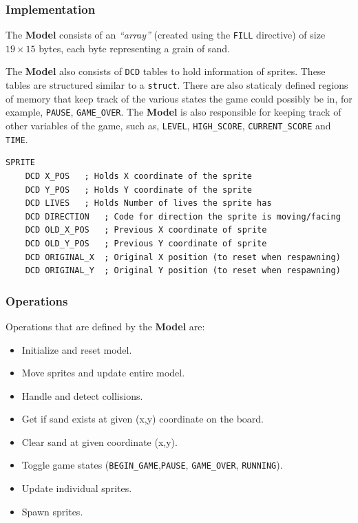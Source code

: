     \subsubsection{Implementation}

    The \textbf{Model} consists of an \emph{``array''} (created using the \texttt{FILL} directive)
    of size $19 \times 15$ bytes, each byte representing a grain of sand.

    The \textbf{Model} also consists of \texttt{DCD} tables to hold information of sprites. These tables are structured similar to a \texttt{struct}.
    There are also staticaly defined regions of memory that keep track of the various states the game could possibly be in,
    for example, \texttt{PAUSE}, \texttt{GAME\_OVER}.
    The \textbf{Model} is also responsible for keeping track of other variables of the game,
    such as, \texttt{LEVEL}, \texttt{HIGH\_SCORE}, \texttt{CURRENT\_SCORE} and \texttt{TIME}.


    \begin{lstlisting}[float,floatplacement=H,caption={Structure for \texttt{SPRITE} data}]
SPRITE
	DCD X_POS	; Holds X coordinate of the sprite
	DCD Y_POS	; Holds Y coordinate of the sprite
	DCD LIVES	; Holds Number of lives the sprite has
	DCD DIRECTION	; Code for direction the sprite is moving/facing
	DCD OLD_X_POS	; Previous X coordinate of sprite
	DCD OLD_Y_POS	; Previous Y coordinate of sprite
	DCD ORIGINAL_X	; Original X position (to reset when respawning)
	DCD ORIGINAL_Y	; Original Y position (to reset when respawning)

    \end{lstlisting}

    \subsubsection{Operations}

    Operations that are defined by the \textbf{Model} are:

    \begin{itemize}
      \item Initialize and reset model.
      \item Move sprites and update entire model.
      \item Handle and detect collisions.
      \item Get if sand exists at given (x,y) coordinate on the board.
      \item Clear sand at given coordinate (x,y).
      \item Toggle game states (\texttt{BEGIN\_GAME},\texttt{PAUSE}, \texttt{GAME\_OVER}, \texttt{RUNNING}).
      \item Update individual sprites.
      \item Spawn sprites.
    \end{itemize}


